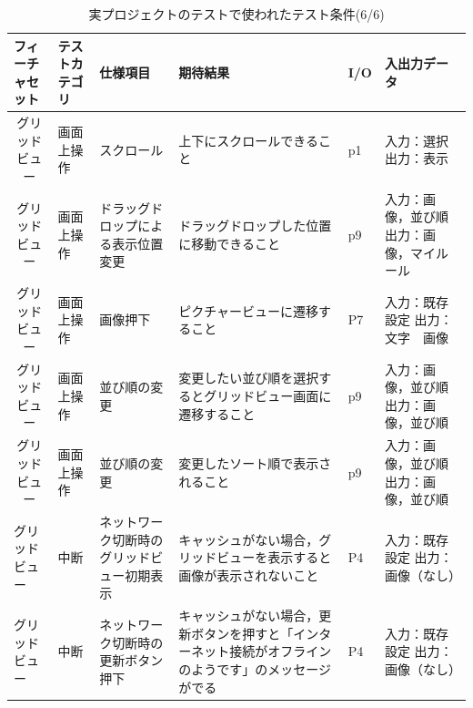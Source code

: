 \begin{table}[htbp]
  \scriptsize
  \centering
  \caption{実プロジェクトのテストで使われたテスト条件(6/6)}
  \begin{tabular}{|p{8em}|p{7em}|p{9em}|p{9em}|p{3em}|p{12em}|}
\cline{1-6}   フィーチャセット & テストカテゴリ  & 仕様項目 & 期待結果  & I/O   & 入出力データ \bigstrut\\
    \hline
    \hline
    \multicolumn{1}{|c|}{グリッドビュー} & 画面上操作 & スクロール & 上下にスクロールできること & p1    & 入力：選択
出力：表示 \bigstrut\\
    \hline
    \multicolumn{1}{|c|}{グリッドビュー} & 画面上操作 & ドラッグドロップによる表示位置変更 & ドラッグドロップした位置に移動できること & p9    & 入力：画像，並び順
出力：画像，マイルール \bigstrut\\
    \hline
    \multicolumn{1}{|c|}{グリッドビュー} & 画面上操作 & 画像押下  & ピクチャービューに遷移すること & P7    & 入力：既存設定
出力：文字　画像 \bigstrut\\
    \hline
    \multicolumn{1}{|c|}{グリッドビュー} & 画面上操作 & 並び順の変更 & 変更したい並び順を選択するとグリッドビュー画面に遷移すること & p9    & 入力：画像，並び順
出力：画像，並び順 \bigstrut\\
    \hline
    \multicolumn{1}{|c|}{グリッドビュー} & 画面上操作 & 並び順の変更 & 変更したソート順で表示されること & p9    & 入力：画像，並び順
出力：画像，並び順 \bigstrut\\
    \hline
    グリッドビュー & 中断    & ネットワーク切断時のグリッドビュー初期表示 & キャッシュがない場合，グリッドビューを表示すると画像が表示されないこと & P4    & 入力：既存設定
出力：画像（なし） \bigstrut\\
    \hline
    グリッドビュー & 中断    & ネットワーク切断時の更新ボタン押下 & キャッシュがない場合，更新ボタンを押すと「インターネット接続がオフラインのようです」のメッセージがでる & P4    & 入力：既存設定
出力：画像（なし） \bigstrut\\
    \hline
    \end{tabular}%
  \label{tab:D-4-ER2-6}%
\end{table}%
